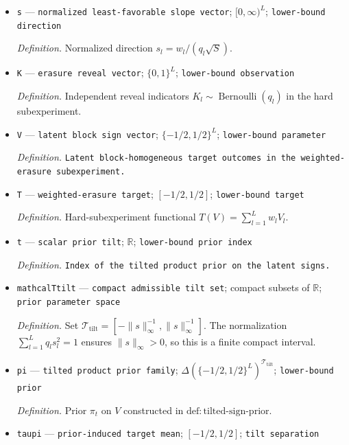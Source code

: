 \documentclass{article}
\begin{document}
\begin{itemize}
  \item \texttt{s} --- \texttt{normalized least-\allowbreak{}favorable slope vector}; \([0,\infty)^L\); \texttt{lower-\allowbreak{}bound direction}
  \par\smallskip\noindent\emph{Definition.} Normalized direction \(s_l=w_l/(q_l\sqrt S)\).
  \item \texttt{K} --- \texttt{erasure reveal vector}; \(\{0,1\}^L\); \texttt{lower-\allowbreak{}bound observation}
  \par\smallskip\noindent\emph{Definition.} Independent reveal indicators \(K_l\sim\operatorname{Bernoulli}(q_l)\) in the hard subexperiment.
  \item \texttt{V} --- \texttt{latent block sign vector}; \(\{-1/2,1/2\}^L\); \texttt{lower-\allowbreak{}bound parameter}
  \par\smallskip\noindent\emph{Definition.} \texttt{Latent block-\allowbreak{}homogeneous target outcomes in the weighted-\allowbreak{}erasure subexperiment.}
  \item \texttt{T} --- \texttt{weighted-\allowbreak{}erasure target}; \([-1/2,1/2]\); \texttt{lower-\allowbreak{}bound target}
  \par\smallskip\noindent\emph{Definition.} Hard-subexperiment functional \(T(V)=\sum_{l=1}^Lw_lV_l\).
  \item \texttt{t} --- \texttt{scalar prior tilt}; \(\mathbb R\); \texttt{lower-\allowbreak{}bound prior index}
  \par\smallskip\noindent\emph{Definition.} \texttt{Index of the tilted product prior on the latent signs.}
  \item \texttt{mathcalTtilt} --- \texttt{compact admissible tilt set}; compact subsets of \(\mathbb R\); \texttt{prior parameter space}
  \par\smallskip\noindent\emph{Definition.} Set \(\mathcal T_{\mathrm{tilt}}=[-\|s\|_\infty^{-1},\|s\|_\infty^{-1}]\). The normalization \(\sum_{l=1}^Lq_ls_l^2=1\) ensures \(\|s\|_\infty>0\), so this is a finite compact interval.
  \item \texttt{pi} --- \texttt{tilted product prior family}; \(\Delta(\{-1/2,1/2\}^L)^{\mathcal T_{\mathrm{tilt}}}\); \texttt{lower-\allowbreak{}bound prior}
  \par\smallskip\noindent\emph{Definition.} Prior \(\pi_t\) on \(V\) constructed in \(\mathrm{def{:}tilted\text{-}sign\text{-}prior}\).
  \item \texttt{taupi} --- \texttt{prior-\allowbreak{}induced target mean}; \([-1/2,1/2]\); \texttt{tilt separation}

\end{itemize}
\end{document}
